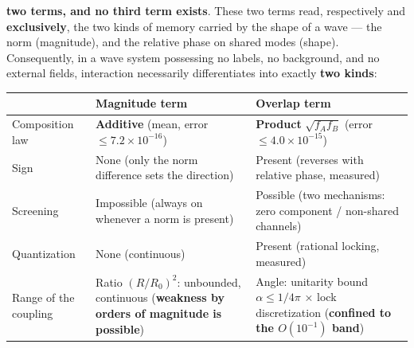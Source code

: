 \documentclass[
  a4paper,
]{article}
\newcounter{none} %
\begin{document}
\textbf{two terms, and no third term exists}. These two terms read,
respectively and \textbf{exclusively}, the two kinds of memory carried
by the shape of a wave --- the norm (magnitude), and the relative phase
on shared modes (shape). Consequently, in a wave system possessing no
labels, no background, and no external fields, interaction necessarily
differentiates into exactly \textbf{two kinds}:

{\def\LTcaptype{none} %
\begin{longtable}[]{@{}
  >{\raggedright\arraybackslash}p{}
  >{\raggedright\arraybackslash}p{}
  >{\raggedright\arraybackslash}p{}@{}}
\toprule\noalign{}
\begin{minipage}[b]{\linewidth}\raggedright
\end{minipage} & \begin{minipage}[b]{\linewidth}\raggedright
Magnitude term
\end{minipage} & \begin{minipage}[b]{\linewidth}\raggedright
Overlap term
\end{minipage} \\
\midrule\noalign{}
\endhead
\bottomrule\noalign{}
\endlastfoot
Composition law & \textbf{Additive} (mean, error
\(\le7.2\times10^{-16}\)) & \textbf{Product} \(\sqrt{f_Af_B}\) (error
\(\le4.0\times10^{-15}\)) \\
Sign & None (only the norm difference sets the direction) & Present
(reverses with relative phase, measured) \\
Screening & Impossible (always on whenever a norm is present) & Possible
(two mechanisms: zero component / non-shared channels) \\
Quantization & None (continuous) & Present (rational locking,
measured) \\
Range of the coupling & Ratio \((R/R_0)^2\): unbounded, continuous
(\textbf{weakness by orders of magnitude is possible}) & Angle:
unitarity bound \(\alpha\le1/4\pi\) × lock discretization
(\textbf{confined to the \(O(10^{-1})\) band}) \\
\end{longtable}
}
\end{document}
